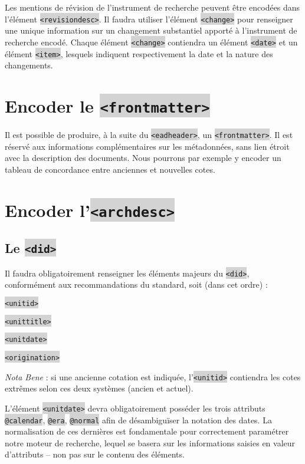 \documentclass[hidelinks, 13pt]{report}
\newcommand{\code}[1]{\colorbox{LightGray}{\texttt{#1}}}
\begin{document}
	Les mentions de révision de l'instrument de recherche peuvent être encodées dans l'élément \code{<revisiondesc>}. Il faudra utiliser l'élément \code{<change>} pour renseigner une unique information sur un changement substantiel apporté à l'instrument de recherche encodé. Chaque élément \code{<change>} contiendra un élément \code{<date>} et un élément \code{<item>}, lesquels indiquent respectivement la date et la nature des changements.
	
	\section{Encoder le \code{<frontmatter>}}
	
	Il est possible de produire, à la suite du \code{<eadheader>}, un \code{<frontmatter>}. Il est réservé aux informations complémentaires sur les métadonnées, sans lien étroit avec la description des documents. Nous pourrons par exemple y encoder un tableau de concordance entre anciennes et nouvelles cotes.
	
	\section{Encoder l'\code{<archdesc>}}
	
	\subsection{Le \code{<did>}}
	
	Il faudra obligatoirement renseigner les éléments majeurs du \code{<did>}, conformément aux recommandations du standard, soit (dans cet ordre) :
	
	\code{<unitid>}
	
	\code{<unittitle>}
	
	\code{<unitdate>}
	
	\code{<origination>}
	
	\textit{Nota Bene} : si une ancienne cotation est indiquée, l'\code{<unitid>} contiendra les cotes extrêmes selon ces deux systèmes (ancien et actuel).
	
	L'élément \code{<unitdate>} devra obligatoirement posséder les trois attributs \code{@calendar}, \code{@era}, \code{@normal} afin de désambiguïser la notation des dates. La normalisation de ces dernières est fondamentale pour correctement paramétrer notre moteur de recherche, lequel se basera sur les informations saisies en valeur d'attributs -- non pas sur le contenu des éléments.
	
\end{document}
